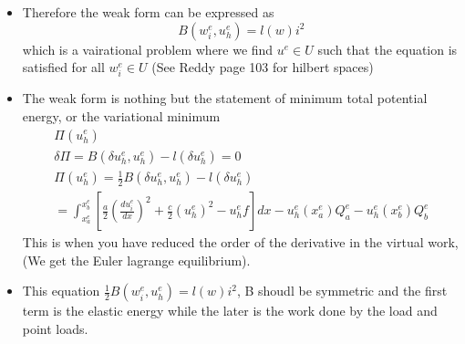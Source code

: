 	\begin{frame}
		\begin{itemize}
			\item Therefore the weak form can be expressed as 
			\begin{equation}
				B(w_i^e,u_h^e) = l(w)i^2
			\end{equation}
			which is a vairational problem where we find $u^e \in U$ such that the equation is satisfied for all $w_i^e \in U$ (See Reddy page 103 for hilbert spaces)
			\item  The weak form is nothing but the statement of minimum total potential energy, or the variational minimum 
			\begin{equation}
				\begin{aligned}
					\Pi(u_h^e) \\
					\delta \Pi = B(\delta u_h^e,u_h^e) - l(\delta u_h^e) = 0 \\
					\Pi(u_h^e) = \frac{1}{2}B(\delta u_h^e,u_h^e) - l(\delta u_h^e) \\
					= \int_{x_a^e}^{x_b^e} \left[\frac{a}{2} \left(\frac{d u_i^e}{dx} \right)^2 + \frac{c}{2}(u_h^e)^2 - u_h^e f \right]dx - u_h^e(x_a^e)Q_a^e  - u_h^e(x_b^e)Q_b^e 
				\end{aligned}
			\end{equation}
			This is when you have reduced the order of the derivative in the virtual work, (We get the Euler lagrange equilibrium).
			\item This equation $\frac{1}{2}B(w_i^e,u_h^e) = l(w)i^2$, B shoudl be symmetric and the first term is the elastic energy while the later is the work done by the load and point loads.
		\end{itemize}
	\end{frame}


